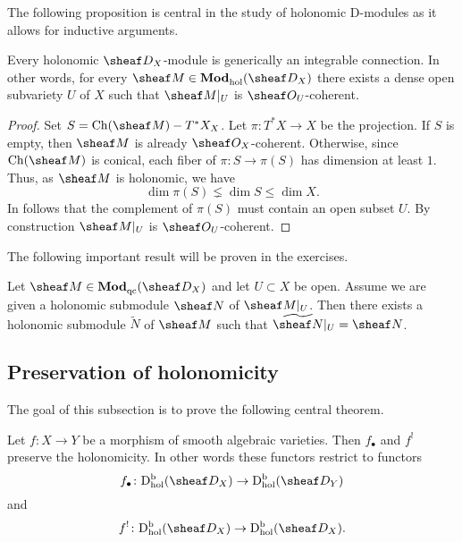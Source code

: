 \documentclass[number-in-sections,a4paper]{notes}
\begin{document}
The following proposition is central in the study of holonomic D-modules as it allows for inductive arguments.

\begin{Proposition}\label{prop:generically-integrable-connection}
    Every holonomic $\sD_X$-module is generically an integrable connection.
    In other words, for every $\sheaf M \in \catDModhol{X}$ there exists a dense open subvariety $U$ of $X$ such that $\res{\sheaf M}{U}$ is $\sO_U$-coherent.
\end{Proposition}

\begin{proof}
    Set $S = \Ch(\sheaf M) \setminus T^*X_X$.
    Let $\pi \colon T^*X \to X$ be the projection.
    If $S$ is empty, then $\sheaf M$ is already $\sO_X$-coherent.
    Otherwise, since $\Ch(\sheaf M)$ is conical, each fiber of $\pi\colon S \to \pi(S)$ has dimension at least $1$.
    Thus, as $\sheaf M$ is holonomic, we have
    \[
        \dim \pi(S) \lneq \dim S \le \dim X.
    \]
    In follows that the complement of $\pi(S)$ must contain an open subset $U$.
    By construction $\res{\sheaf M}{U}$ is $\sO_U$-coherent.
\end{proof}

The following important result will be proven in the exercises.

\begin{Proposition}\label{prop:extension-of-holonomic}
    Let $\sheaf M \in \catDModqc{X}$ and let $U \subset X$ be open.
    Assume we are given a holonomic submodule $\sheaf N$ of $\res{\sheaf M}{U}$.
    Then there exists a holonomic submodule $\widetilde N$ of $\sheaf M$ such that $\res{\widetilde{\sheaf N}}{U} = \sheaf N$.
\end{Proposition}

\subsection{Preservation of holonomicity}

The goal of this subsection is to prove the following central theorem.

\begin{Theorem}\label{thm:preservation-of-holonomicity}
    Let $f\colon X \to Y$ be a morphism of smooth algebraic varieties.
    Then $f_\bullet$ and $f^!$ preserve the holonomicity.
    In other words these functors restrict to functors
    \[
        f_\bullet\colon \catDbDModhol{X} \to \catDbDModhol{Y}
    \]
    and
    \[
        f^!\colon \catDbDModhol{X} \to \catDbDModhol{X}.
    \]
\end{Theorem}
\end{document}
